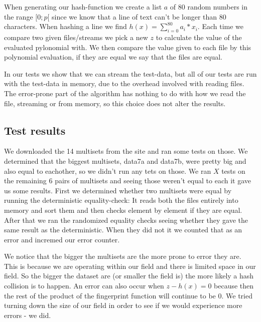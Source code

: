 \documentclass[article,a4paper,oneside]{article}
\newcommand{\+}[1]{\ensuremath{\boldsymbol{#1}}}
\begin{document}
When generating our hash-function we create a list $a$ of 80 random numbers in the range $[0;p[$ since we know that a line of text can't be longer than 80 characters. When hashing a line we find $h(x) = \sum_{i=0}^{80}a_i*x_i $. Each time we compare two given files/streams we pick a new $z$ to calculate the value of the evaluated pylonomial with. We then compare the value given to each file by this polynomial evaluation, if they are equal we say that the files are equal.

	In our tests we show that we can stream the test-data, but all of our tests are run with the test-data in memory, due to the overhead involved with reading files. The error-prone part of the algorithm has nothing to do with how we read the file, streaming or from memory, so this choice does not alter the results. 


\subsection*{Test results}

We downloaded the 14 multisets from the site and ran some tests on those. We determined that the biggest multisets, data7a and data7b, were pretty big and also equal to eachother, so we didn't run any tets on those. We ran $X$  tests on the remaining 6 pairs of multisets and seeing those weren't equal to each it gave us some results. First we determined whether two multisets were equal by running the deterministic equality-check: It reads both the files entirely into memory and sort them and then checks element by element if they are equal. After that we ran the randomized equality checks seeing whether they gave the same result as the deterministic. When they did not it we counted that as an error and incremed our error counter.

We notice that the bigger the multisets are the more prone to error they are. This is because we are operating within our field and there is limited space in our field. So the bigger the dataset are (or smaller the field is) the more likely a hash collision is to happen. An error can also occur when $z-h(x)=0$ because then the rest of the product of the fingerprint function will continue to be $0$. We tried turning down the size of our field in order to see if we would experience more errors - we did.

\end{document}

